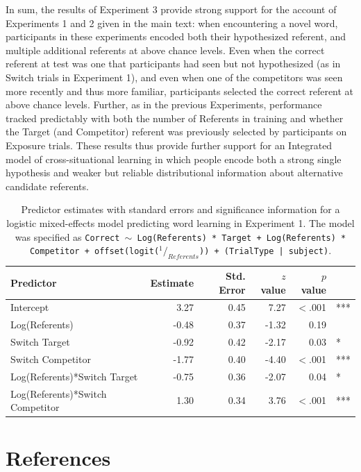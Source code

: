 \documentclass[authoryear,review]{elsarticle}
\begin{document}
In sum, the results of Experiment 3 provide strong support for the account of Experiments 1 and 2 given in the main text: when encountering a novel word, participants in these experiments encoded both their hypothesized referent, and multiple additional referents at above chance levels. Even when the correct referent at test was one that participants had seen but not hypothesized (as in Switch trials in Experiment 1), and even when one of the competitors was seen more recently and thus more familiar, participants selected the correct referent at above chance levels. Further, as in the previous Experiments, performance tracked predictably with both the number of Referents in training and whether the Target (and Competitor) referent was previously selected by participants on Exposure trials. These results thus provide further support for an Integrated model of cross-situational learning in which people encode both a strong single hypothesis and weaker but reliable distributional information about alternative candidate referents. 

\begin{table}[tb]
\begin{center}
\begin{tabular}{lrrrrl}
 Predictor & Estimate & Std. Error & $z$ value & $p$ value &  \\ 
  \hline
  Intercept & 3.27 & 0.45 & 7.27 & $<$.001 & *** \\ 
  Log(Referents) & -0.48 & 0.37 & -1.32 & 0.19 &  \\ 
  Switch Target & -0.92 & 0.42 & -2.17 & 0.03 & * \\ 
  Switch Competitor & -1.77 & 0.40 & -4.40 & $<$.001 & *** \\ 
  Log(Referents)*Switch Target & -0.75 & 0.36 & -2.07 & 0.04 & * \\ 
  Log(Referents)*Switch Competitor & 1.30 & 0.34 & 3.76 & $<$.001 & *** \\ 
   \hline
\end{tabular}
\label{tab:exp3_reg}\end{center}
\vspace{6pt}
\caption{\label{tab:exp3_reg}Predictor estimates with standard errors and significance information for a logistic mixed-effects model predicting word learning in Experiment 1. The model was specified as {\tt{Correct $\sim$ Log(Referents) * Target + Log(Referents) * Competitor + offset(logit($^1/_{Referents}$)) + (TrialType | subject)}}.}
\end{table}

\newpage

\section*{References}

\end{document}
